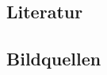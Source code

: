 %
%





\tucthreeheadlines{}
\begin{frame}
    \begin{center}
    \end{center}
\end{frame}

\tuctwoheadlines{}
\section*{\ShortTitle}
\subsection*{Literatur}
\begin{frame}
    \frametitle{\currentsectionname}
    
\end{frame}

\subsection*{Bildquellen}
\begin{frame}
    \frametitle{\currentsectionname}
    \printendnotes{}
\end{frame}


